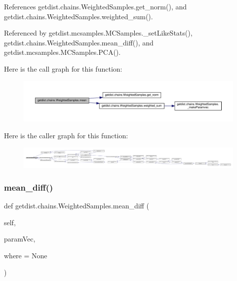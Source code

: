 References getdist.\+chains.\+Weighted\+Samples.\+get\+\_\+norm(), and getdist.\+chains.\+Weighted\+Samples.\+weighted\+\_\+sum().



Referenced by getdist.\+mcsamples.\+M\+C\+Samples.\+\_\+set\+Like\+Stats(), getdist.\+chains.\+Weighted\+Samples.\+mean\+\_\+diff(), and getdist.\+mcsamples.\+M\+C\+Samples.\+P\+C\+A().

Here is the call graph for this function\+:
\nopagebreak
\begin{figure}[H]
\begin{center}
\leavevmode
\includegraphics[width=350pt]{classgetdist_1_1chains_1_1WeightedSamples_a72a6f011746d852ea089302d90f59159_cgraph}
\end{center}
\end{figure}
Here is the caller graph for this function\+:
\nopagebreak
\begin{figure}[H]
\begin{center}
\leavevmode
\includegraphics[width=350pt]{classgetdist_1_1chains_1_1WeightedSamples_a72a6f011746d852ea089302d90f59159_icgraph}
\end{center}
\end{figure}
\mbox{\label{classgetdist_1_1chains_1_1WeightedSamples_a4a7ffc36e87801cb74f9ec78896c220b}} 
\subsubsection{\texorpdfstring{mean\+\_\+diff()}{mean\_diff()}}
{\footnotesize\ttfamily def getdist.\+chains.\+Weighted\+Samples.\+mean\+\_\+diff (\begin{DoxyParamCaption}\item[{}]{self,  }\item[{}]{param\+Vec,  }\item[{}]{where = {\ttfamily None} }\end{DoxyParamCaption})}

